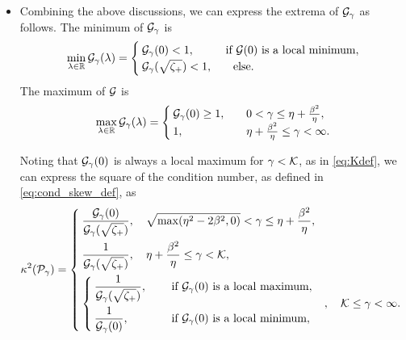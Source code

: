 \documentclass[a4paper,10pt]{article}
\begin{document}
{\begin{itemize}
\begin{enumerate}
\end{enumerate}


\item Combining the above discussions, we can express the extrema of ${\cal G}_{\gamma}$ as follows. The minimum of ${\cal G}_{\gamma}$ is
\begin{align}
\min \limits_{\lambda \in \mathbb{R}} {\cal G}_{\gamma}(\lambda)
=
\begin{cases}
{\cal G}_{\gamma}(0) < 1, \quad &\textrm{ if } {\cal G}(0) \textrm{ is a local minimum}, \\
{\cal G}_{\gamma}(\sqrt{\zeta_+}) < 1, &\quad \textrm{else}.
\end{cases}
\end{align}
%
The maximum of ${\cal G}$ is
\begin{align}
\max \limits_{\lambda \in \mathbb{R}} {\cal G}_{\gamma}(\lambda)
=
\begin{cases}
{\cal G}_{\gamma}(0) \geq 1, \quad & 0 < \gamma \leq \eta + \frac{\beta^2}{\eta}, \\
1, \quad & \eta + \frac{\beta^2}{\eta} \leq \gamma  < \infty.
\end{cases}
\end{align}

Noting that ${\cal G}_{\gamma}(0)$ is always a local maximum for $\gamma < {\cal K}$, as in \eqref{eq:Kdef}, we can express the square of the condition number, as defined in \eqref{eq:cond_skew_def}, as
\begin{align} \label{eq:cond_val_skew}
\kappa^2({\cal P}_{\gamma}) =
\begin{cases}
\displaystyle
\frac{{\cal G}_{\gamma}(0)}{{\cal G}_{\gamma}(\sqrt{\zeta_+})}, 
\quad \sqrt{\max(\eta^2 - 2 \beta^2, 0)} < \gamma \leq \eta + \frac{\beta^2}{\eta}, \\[2.5ex]
\displaystyle
\frac{1}{{\cal G}_{\gamma}(\sqrt{\zeta_+})}, \quad \eta + \frac{\beta^2}{\eta} \leq \gamma < {\cal K}, \\[2.5ex]
\begin{cases}
\displaystyle
\frac{1}{{\cal G}_{\gamma}(\sqrt{\zeta_+})}, \quad &\textrm{ if } {\cal G}_{\gamma}(0) \textrm{ is a local maximum}, \\[2.5ex]
\displaystyle
\frac{1}{{\cal G}_{\gamma}(0)}, \quad &\textrm{ if } {\cal G}_{\gamma}(0) \textrm{ is a local minimum}, \quad \\
\end{cases},
\quad {\cal K} \leq \gamma < \infty.
\end{cases}
\end{align}


\end{itemize}}
\end{document}
